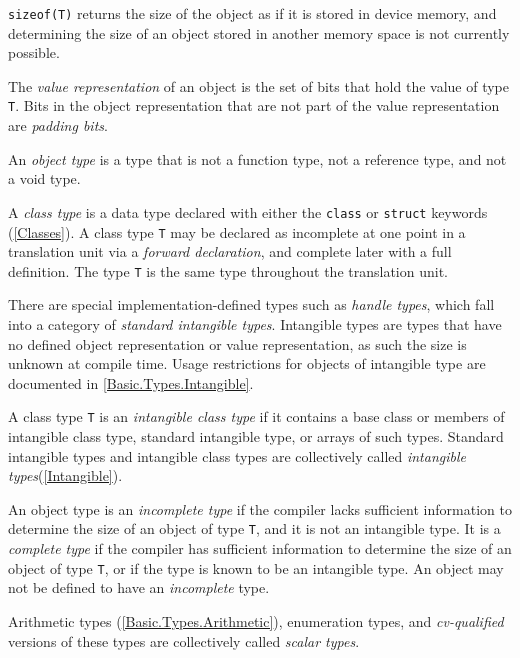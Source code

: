 \begin{note}
  \texttt{sizeof(T)} returns the size of the object as if it is stored in device
  memory, and determining the size of an object stored in another memory space
  is not currently possible.
\end{note}

\p The \textit{value representation} of an object is the set of bits that hold
the value of type \texttt{T}. Bits in the object representation that are not
part of the value representation are \textit{padding bits}.

\p An \textit{object type} is a type that is not a function type, not a
reference type, and not a void type.

\p A \textit{class type} is a data type declared with either the \texttt{class}
or \texttt{struct} keywords (\ref{Classes}). A class type \texttt{T} may be
declared as incomplete at one point in a translation unit via a \textit{forward
declaration}, and complete later with a full definition. The type \texttt{T} is
the same type throughout the translation unit.

\p There are special implementation-defined types such as \textit{handle types},
which fall into a category of \textit{standard intangible types}. Intangible
types are types that have no defined object representation or value
representation, as such the size is unknown at compile time. Usage restrictions
for objects of intangible type are documented in \ref{Basic.Types.Intangible}.

\p A class type \texttt{T} is an \textit{intangible class type} if it contains
a base class or members of intangible class type, standard intangible type,
or arrays of such types. Standard intangible types and intangible class types
are collectively called \textit{intangible types}(\ref{Intangible}).

\p An object type is an \textit{incomplete type} if the compiler lacks
sufficient information to determine the size of an object of type \texttt{T},
and it is not an intangible type. It is a \textit{complete type} if the compiler
has sufficient information to determine the size of an object of type
\texttt{T}, or if the type is known to be an intangible type. An object may not
be defined to have an \textit{incomplete} type.

\p Arithmetic types (\ref{Basic.Types.Arithmetic}), enumeration types, and
\textit{cv-qualified} versions of these types are collectively called
\textit{scalar types}.


